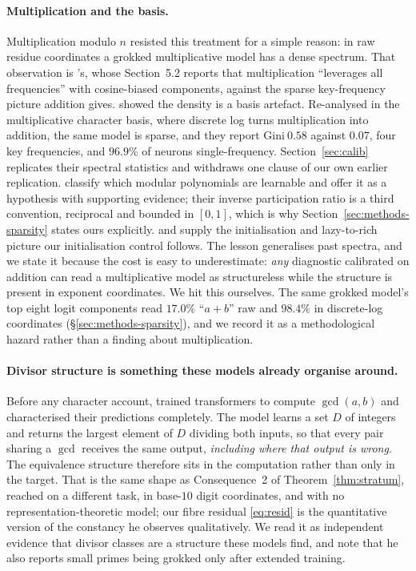 \paragraph{Multiplication and the basis.} Multiplication modulo $n$ resisted this treatment
for a simple reason: in raw residue coordinates a grokked multiplicative model has a dense
spectrum. That observation is \citet{furuta2024towards}'s, whose Section~5.2 reports that
multiplication ``leverages all frequencies'' with cosine-biased components, against the sparse
key-frequency picture addition gives.
\citet{nguyen2026dlogclock} showed the density is a basis artefact. Re-analysed
in the multiplicative character basis, where discrete log turns multiplication into addition,
the same model is sparse, and they report $\mathrm{Gini}\ 0.58$ against $0.07$, four key
frequencies, and $96.9\%$ of neurons single-frequency. Section~\ref{sec:calib} replicates
their spectral statistics and withdraws one clause of our own earlier replication.
\citet{doshi2024grokking} classify which modular polynomials are learnable and offer it as a
hypothesis with supporting evidence; their inverse participation ratio is a third convention,
reciprocal and bounded in $[0,1]$, which is why Section~\ref{sec:methods-sparsity} states ours
explicitly. \citet{furuta2024towards} and \citet{kunin2024getrich} supply the initialisation
and lazy-to-rich picture our initialisation control follows.
The lesson generalises past spectra, and we state it because the cost is easy to underestimate:
\emph{any} diagnostic calibrated on addition can read a multiplicative model as structureless
while the structure is present in exponent coordinates. We hit this ourselves. The same
grokked model's top eight logit components read $17.0\%$ ``$a+b$'' raw and $98.4\%$ in discrete-log coordinates
(\S\ref{sec:methods-sparsity}), and we record it as a methodological hazard rather than a
finding about multiplication.

\paragraph{Divisor structure is something these models already organise around.}
Before any character account, \citet{charton2024learning} trained transformers to compute
$\gcd(a, b)$ and characterised their predictions completely. The model learns a set $D$ of
integers and returns the largest element of $D$ dividing both inputs, so that every pair
sharing a $\gcd$ receives the same output, \emph{including where that output is wrong}.
The equivalence structure therefore sits in the computation rather than only in the target.
That is the same shape as Consequence~2 of Theorem~\ref{thm:stratum}, reached on a different
task, in base-$10$ digit coordinates, and with no representation-theoretic model; our fibre
residual \eqref{eq:resid} is the quantitative version of the constancy he observes
qualitatively. We read it as independent evidence that divisor classes are a structure these
models find, and note that he also reports small primes being grokked only after extended
training.

